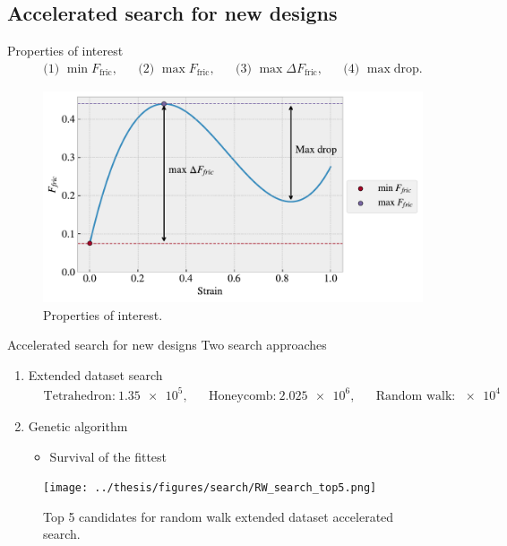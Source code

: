 \documentclass[
	10pt, %
]{beamer}
\begin{document}
\subsection{Accelerated search for new designs}
\begin{frame}{Properties of interest}
	\begin{align*}
		&\text{(1) } \min F_{\text{fric}},& &\text{(2) } \max F_{\text{fric}},& &\text{(3) } \max \Delta F_{\text{fric}},& &\text{(4) } \max \text{drop}.&
	\end{align*}
	\begin{figure}[H]
		\centering
		\includegraphics[width=0.8\linewidth]{figures/prop_of_interets.pdf}
		\caption{Properties of interest.}
	\end{figure}
\end{frame}
%
%
\begin{frame}{Accelerated search for new designs}
	Two search approaches
	\begin{enumerate}
		\item Extended dataset search
		\begin{align*}
			&\text{Tetrahedron:} \ \num{1.35e5},& &\text{Honeycomb:} \ \num{2.025e6},& &\text{Random walk:} \ \num{e4}&
		\end{align*}
		\item Genetic algorithm
		\begin{itemize}
			\item Survival of the fittest 
		\end{itemize}
	\end{enumerate}

	\begin{figure}[H]
		\centering
		\texttt{[image: ../thesis/figures/search/RW\_search\_top5.png]}
		\caption{Top 5 candidates for random walk extended dataset accelerated search. }
	\end{figure}  
\end{frame}
%
%
\end{document}
